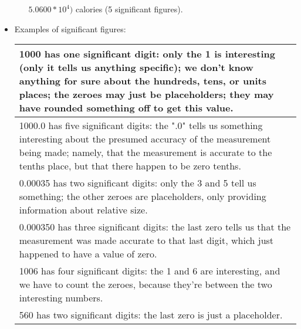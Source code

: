 \begin{itemize}
\begin{enumerate}
$5.0600*10^4)$ calories (5 significant figures).
\end{enumerate}
\item Examples of significant figures:
\begin{table}[h]
\begin{tabular}{|p{16cm}|}
\hline
\scriptsize{1000 has   one significant digit: only the 1 is interesting (only it tells us anything   specific); we don't know anything for sure about the hundreds, tens, or units   places; the zeroes may just be placeholders; they may have rounded something   off to get this value.                                    } \\ \hline
\scriptsize{1000.0 has five significant   digits: the ".0" tells us something interesting about the presumed   accuracy of the measurement being made; namely, that the measurement is   accurate to the tenths place, but that there happen to be zero tenths.                                                               } \\ \hline
\scriptsize{0.00035 has two significant   digits: only the 3 and 5 tell us something; the other zeroes are   placeholders, only providing information about relative size.                                                                                                                                                    } \\ \hline
\scriptsize{0.000350 has three significant   digits: the last zero tells us that the measurement was made accurate to that   last digit, which just happened to have a value of zero.                                                                                                                                         } \\ \hline
\scriptsize{1006 has four significant   digits: the 1 and 6 are interesting, and we have to count the zeroes, because   they're between the two interesting numbers.                                                                                                                                                          } \\ \hline
\scriptsize{560 has two significant   digits: the last zero is just a placeholder.                                                                                                                                                                                                                                            } \\ \hline

\end{tabular}
\end{table}
\end{itemize}
